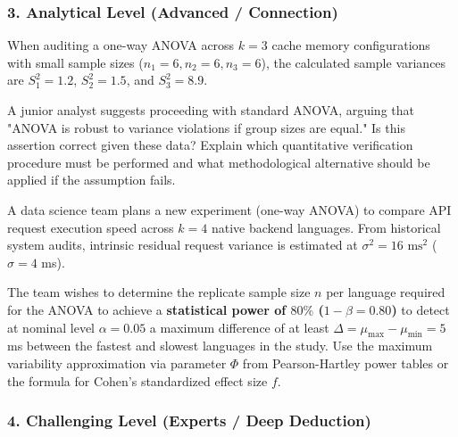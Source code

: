 \subsubsection*{3. Analytical Level (Advanced / Connection)}

\begin{problema}
	\label{prob:verificacion_supuestos_anova}
	When auditing a one-way ANOVA across $k = 3$ cache memory configurations with small sample sizes ($n_1=6, n_2=6, n_3=6$), the calculated sample variances are $S_1^2 = 1.2$, $S_2^2 = 1.5$, and $S_3^2 = 8.9$.
	
	A junior analyst suggests proceeding with standard ANOVA, arguing that "ANOVA is robust to variance violations if group sizes are equal." Is this assertion correct given these data? Explain which quantitative verification procedure must be performed and what methodological alternative should be applied if the assumption fails.
\end{problema}

\begin{problema}
	\label{prob:potencia_tamano_anova}
	A data science team plans a new experiment (one-way ANOVA) to compare API request execution speed across $k = 4$ native backend languages. From historical system audits, intrinsic residual request variance is estimated at $\sigma^2 = 16$ $\text{ms}^2$ ($\sigma = 4$ ms).
	
	The team wishes to determine the replicate sample size $n$ per language required for the ANOVA to achieve a \textbf{statistical power of $80\%$ ($1 - \beta = 0.80$)} to detect at nominal level $\alpha = 0.05$ a maximum difference of at least $\Delta = \mu_{\text{max}} - \mu_{\text{min}} = 5$ ms between the fastest and slowest languages in the study. Use the maximum variability approximation via parameter $\Phi$ from Pearson-Hartley power tables or the formula for Cohen's standardized effect size $f$.
\end{problema}

\subsubsection*{4. Challenging Level (Experts / Deep Deduction)}


